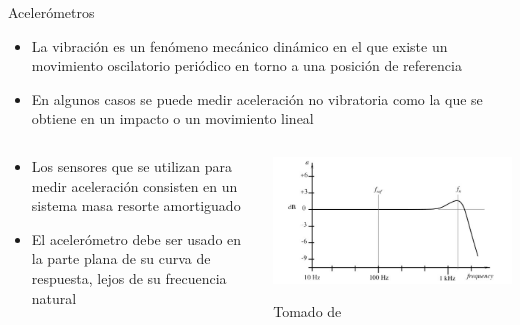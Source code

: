 \documentclass[aspectratio=169]{beamer}
\begin{document}
\begin{frame}{Acelerómetros}
    \begin{itemize}
        \item La vibración es un fenómeno mecánico dinámico en el que existe un movimiento oscilatorio periódico en torno a una posición de referencia 
        \item En algunos casos se puede medir aceleración no vibratoria como la que se obtiene en un impacto o un movimiento lineal
    \end{itemize}
    \begin{columns}[onlytextwidth]
        \begin{column}{0.55\textwidth}
            \begin{itemize}
                \item Los sensores que se utilizan para medir aceleración consisten en un sistema masa resorte amortiguado
                \item El acelerómetro debe ser usado en la parte plana de su curva de respuesta, lejos de su frecuencia natural
            \end{itemize}
        \end{column}
        \begin{column}{0.45\textwidth}
            \centering
            \includegraphics[width = 1\linewidth]{fig/Fuerza_Vibracion/acel.JPG}

            \tiny{Tomado de \cite{Fraden_2016}}
        \end{column}
    \end{columns}
\end{frame}
\end{document}
